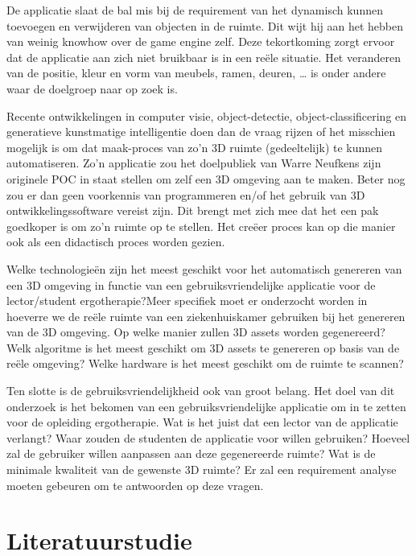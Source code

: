 \documentclass{hogent-article}
\begin{document}
De applicatie slaat de bal mis bij de requirement van het dynamisch kunnen toevoegen en verwijderen van objecten in de ruimte. Dit wijt hij aan het hebben van weinig knowhow over de game engine zelf. Deze tekortkoming zorgt ervoor dat de applicatie aan zich niet bruikbaar is in een reële situatie. Het veranderen van de positie, kleur en vorm van meubels, ramen, deuren, … is onder andere waar de doelgroep naar op zoek is. 

Recente ontwikkelingen in computer visie, object-detectie, object-classificering en generatieve kunstmatige  intelligentie doen dan de vraag rijzen of het misschien mogelijk is om dat maak-proces van zo’n 3D ruimte (gedeeltelijk) te kunnen automatiseren. Zo’n applicatie zou het doelpubliek van Warre Neufkens zijn originele POC in staat stellen om zelf een 3D omgeving aan te maken. Beter nog zou er dan geen voorkennis van programmeren en/of het gebruik van 3D ontwikkelingssoftware vereist zijn. Dit brengt met zich mee dat het een pak goedkoper is om zo’n ruimte op te stellen. Het creëer proces kan op die manier ook als een didactisch proces worden gezien. 

Welke technologieën zijn het meest geschikt voor het automatisch genereren van een 3D omgeving in functie van een gebruiksvriendelijke applicatie voor de lector/student ergotherapie?Meer specifiek moet er onderzocht worden in hoeverre we de reële ruimte van een ziekenhuiskamer gebruiken bij het genereren van de 3D omgeving. Op welke manier zullen 3D assets worden gegenereerd? Welk algoritme is het meest geschikt om 3D assets te genereren op basis van de reële omgeving? Welke hardware is het meest geschikt om de ruimte te scannen? 

Ten slotte is de gebruiksvriendelijkheid ook van groot belang. Het doel van dit onderzoek is het bekomen van een gebruiksvriendelijke applicatie om in te zetten voor de opleiding ergotherapie. Wat is het juist dat een lector van de applicatie verlangt? Waar zouden de studenten de applicatie voor willen gebruiken? Hoeveel zal de gebruiker willen aanpassen aan deze gegenereerde ruimte? Wat is de minimale kwaliteit van de gewenste 3D ruimte?  Er zal een requirement analyse moeten gebeuren om te antwoorden op deze vragen.



\section{Literatuurstudie}%
\label{sec:literatuurstudie}
\end{document}
